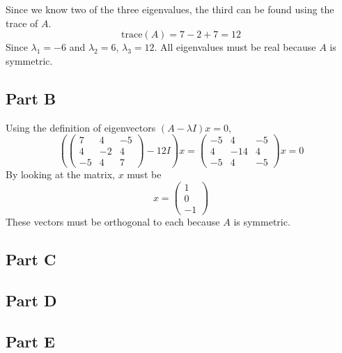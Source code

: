 \documentclass{article}
\begin{document}
Since we know two of the three eigenvalues, the third can be found using the
trace of $A$.
$$ \mathrm{trace}(A) = 7 - 2 + 7 = 12 $$
Since $\lambda_1 = -6$ and $\lambda_2 = 6$, $\lambda_3 = 12$. All eigenvalues
must be real because $A$ is symmetric.

\subsection*{Part B}

Using the definition of eigenvectors $(A - \lambda I) x = 0$,
$$ \left(\begin{pmatrix}
  7 & 4 & -5 \\
  4 & -2 & 4 \\
  -5 & 4 & 7
\end{pmatrix} - 12 I\right) x = \begin{pmatrix}
  -5 & 4 & -5 \\
  4 & -14 & 4 \\
  -5 & 4 & -5
\end{pmatrix} x = 0 $$
By looking at the matrix, $x$ must be
$$ x = \begin{pmatrix}
  1 \\
  0 \\
  -1
\end{pmatrix} $$
These vectors must be orthogonal to each because $A$ is symmetric.

\subsection*{Part C}

\subsection*{Part D}

\subsection*{Part E}
\end{document}
